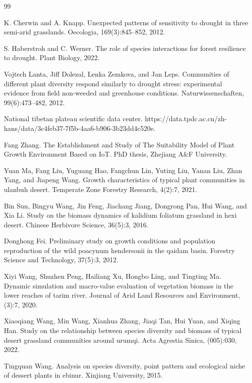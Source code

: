 \documentclass[11pt,a4paper]{ctexart}
\begin{document}
\begin{thebibliography}{99}

 K. Cherwin and A. Knapp. Unexpected patterns of sensitivity to drought in three semi-arid grasslands. Oecologia, 169(3):845--852, 2012.

 S. Haberstroh and C. Werner. The role of species interactions for forest resilience to drought. Plant Biology, 2022.

 Vojtech Lanta, Jiff Dolezal, Lenka Zemkova, and Jan Leps. Communities of different plant diversity respond similarly to drought stress: experimental evidence from field non-weeded and greenhouse conditions. Naturwissenschaften, 99(6):473--482, 2012.

 National tibetan plateau scientific data center. https://data.tpdc.ac.cn/zh-hans/data/3c4feb37-7f5b-4aa6-b906-3b23dd4c520e.

 Fang Zhang. The Establishment and Study of The Suitability Model of Plant Growth Environment Based on IoT. PhD thesis, Zhejiang A\&F University.

 Yuan Ma, Fang Liu, Yuguang Hao, Fangchun Lin, Yuting Liu, Yanan Liu, Zhan Yang, and Jiapeng Wang. Growth characteristics of typical plant communities in ulanbuh desert. Temperate Zone Forestry Research, 4(2):7, 2021.

 Bin Sun, Bingyu Wang, Jin Feng, Jiachang Jiang, Dongrong Pan, Hui Wang, and Xia Li. Study on the biomass dynamics of kalidium foliatum grassland in hexi desert. Chinese Herbivore Science, 36(5):3, 2016.

 Donghong Fei. Preliminary study on growth conditions and population reproduction of the wild poacynum hendersonii in the qaidam basin. Forestry Science and Technology, 37(5):3, 2012.

 Xiyi Wang, Shuzhen Peng, Hailiang Xu, Hongbo Ling, and Tingting Ma. Dynamic simulation and macro-value evaluation of vegetation biomass in the lower reaches of tarim river. Journal of Arid Land Resources and Environment, (3):7, 2020.

 Xiaoqiang Wang, Min Wang, Xianhua Zhang, Jiaqi Tan, Hui Yuan, and Xiqing Han. Study on the relationship between species diversity and biomass of typical desert grassland communities around urumqi. Acta Agrestia Sinica, (005):030, 2022.

 Tingquan Wang. Analysis on species diversity, point pattern and ecological niche of dessert plants in ebinur. Xinjiang University, 2015.


\end{thebibliography}
\end{document}
